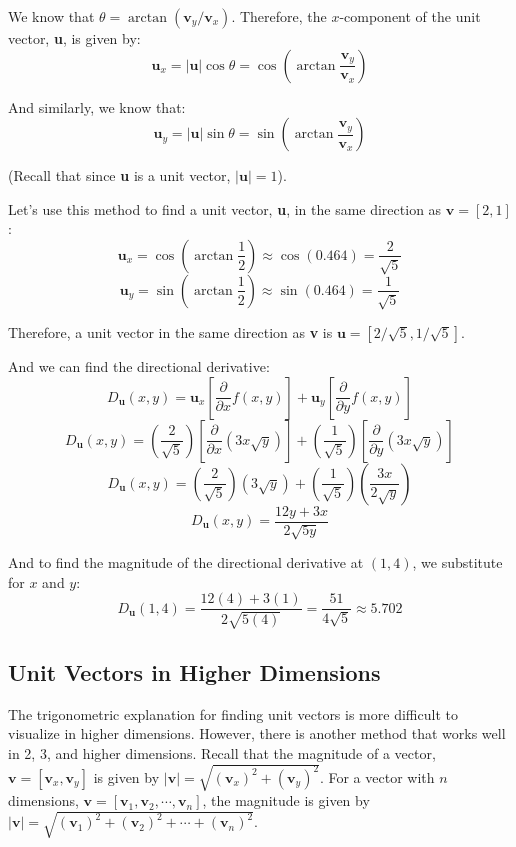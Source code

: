 We know that $\theta = \arctan{ \left( \textbf{v}_y / \textbf{v}_x \right)}$. 
Therefore, the $x$-component of the unit vector, \textbf{u}, is given by:
$$\textbf{u}_x = |\textbf{u}| \cos{ \theta} = \cos{ \left( \arctan{ \frac{
\textbf{v}_y}{\textbf{v}_x}} \right)}$$

And similarly, we know that:
$$\textbf{u}_y = |\textbf{u}| \sin{ \theta} = \sin{ \left( \arctan{ \frac{
\textbf{v}_y}{\textbf{v}_x}} \right)}$$

(Recall that since \textbf{u} is a unit vector, $|\textbf{u}| = 1$). 

Let's use this method to find a unit vector, \textbf{u}, in the same direction 
as $\textbf{v} = \left[ 2, 1 \right]$:
$$\textbf{u}_x = \cos{ \left( \arctan{ \frac{1}{2} } \right) } \approx \cos{ 
\left( 0.464 \right) } = \frac{2}{\sqrt{5}}$$
$$\textbf{u}_y = \sin{ \left( \arctan{ \frac{1}{2} } \right) } \approx \sin{ 
\left( 0.464 \right)} = \frac{1}{\sqrt{5}}$$

Therefore, a unit vector in the same direction as \textbf{v} is $\textbf{u} = 
\left[ 2/\sqrt{5}, 1/\sqrt{5} \right]$. 

And we can find the directional derivative:
$$D_{\textbf{u}}(x, y) = \textbf{u}_x \left[ \frac{\partial}{\partial x} f(x, 
y) \right] + \textbf{u}_y \left[ \frac{\partial}{\partial y} f(x, y) \right]$$
$$D_{\textbf{u}}(x, y) = \left( \frac{2}{\sqrt{5}} \right) \left[ \frac{
\partial}{\partial x} \left( 3x\sqrt{y} \right) \right] + \left( \frac{1}{
\sqrt{5}} \right) \left[ \frac{\partial}{\partial y} \left( 3x\sqrt{y} \right) 
\right]$$
$$D_{\textbf{u}}(x, y) = \left( \frac{2}{\sqrt{5}} \right) \left( 3\sqrt{y} 
\right) + \left( \frac{1}{\sqrt{5}} \right) \left( \frac{3x}{2\sqrt{y}} 
\right)$$
$$D_{\textbf{u}}(x, y) = \frac{12y + 3x}{2\sqrt{5y}}$$

And to find the magnitude of the directional derivative at $(1, 4)$, we 
substitute for $x$ and $y$:
$$D_{\textbf{u}}(1, 4) = \frac{12(4) + 3(1)}{2\sqrt{5(4)}} = \frac{51}{4\sqrt{5}} 
\approx 5.702$$

\subsection{Unit Vectors in Higher Dimensions}
The trigonometric explanation for finding unit vectors is more difficult to 
visualize in higher dimensions. However, there is another method that works 
well in 2, 3, and higher dimensions. Recall that the magnitude of a vector, 
$\textbf{v} = \left[ \textbf{v}_x, \textbf{v}_y \right]$ is given by $| 
\textbf{v} | = \sqrt{\left( \textbf{v}_x \right)^2 + \left( \textbf{v}_y 
\right)^2}$. For a vector with $n$ dimensions, $\textbf{v} = \left[ \textbf{v}_
1, \textbf{v}_2, \cdots , \textbf{v}_n \right]$, the magnitude is given by $| 
\textbf{v} | = \sqrt{ \left( \textbf{v}_1 \right)^2 + \left( \textbf{v}_2 
\right)^2 + \cdots + \left( \textbf{v}_n \right)^2}$. 

